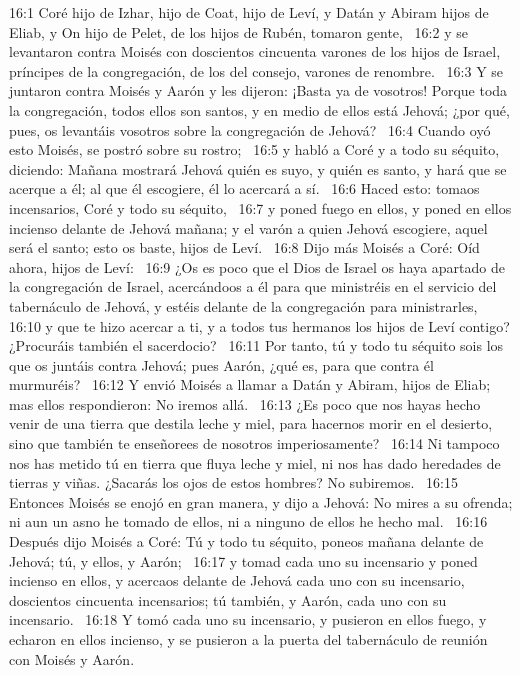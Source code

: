 16:1 Coré hijo de Izhar, hijo de Coat, hijo de Leví, y Datán y Abiram hijos de Eliab, y On hijo de Pelet, de los hijos de Rubén, tomaron gente,  
16:2 y se levantaron contra Moisés con doscientos cincuenta varones de los hijos de Israel, príncipes de la congregación, de los del consejo, varones de renombre.  
16:3 Y se juntaron contra Moisés y Aarón y les dijeron: ¡Basta ya de vosotros! Porque toda la congregación, todos ellos son santos, y en medio de ellos está Jehová; ¿por qué, pues, os levantáis vosotros sobre la congregación de Jehová?  
16:4 Cuando oyó esto Moisés, se postró sobre su rostro;  
16:5 y habló a Coré y a todo su séquito, diciendo: Mañana mostrará Jehová quién es suyo, y quién es santo, y hará que se acerque a él; al que él escogiere, él lo acercará a sí.  
16:6 Haced esto: tomaos incensarios, Coré y todo su séquito,  
16:7 y poned fuego en ellos, y poned en ellos incienso delante de Jehová mañana; y el varón a quien Jehová escogiere, aquel será el santo; esto os baste, hijos de Leví.  
16:8 Dijo más Moisés a Coré: Oíd ahora, hijos de Leví:  
16:9 ¿Os es poco que el Dios de Israel os haya apartado de la congregación de Israel, acercándoos a él para que ministréis en el servicio del tabernáculo de Jehová, y estéis delante de la congregación para ministrarles,  
16:10 y que te hizo acercar a ti, y a todos tus hermanos los hijos de Leví contigo? ¿Procuráis también el sacerdocio?  
16:11 Por tanto, tú y todo tu séquito sois los que os juntáis contra Jehová; pues Aarón, ¿qué es, para que contra él murmuréis?  
16:12 Y envió Moisés a llamar a Datán y Abiram, hijos de Eliab; mas ellos respondieron: No iremos allá.  
16:13 ¿Es poco que nos hayas hecho venir de una tierra que destila leche y miel, para hacernos morir en el desierto, sino que también te enseñorees de nosotros imperiosamente?  
16:14 Ni tampoco nos has metido tú en tierra que fluya leche y miel, ni nos has dado heredades de tierras y viñas. ¿Sacarás los ojos de estos hombres? No subiremos.  
16:15 Entonces Moisés se enojó en gran manera, y dijo a Jehová: No mires a su ofrenda; ni aun un asno he tomado de ellos, ni a ninguno de ellos he hecho mal.  
16:16 Después dijo Moisés a Coré: Tú y todo tu séquito, poneos mañana delante de Jehová; tú, y ellos, y Aarón;  
16:17 y tomad cada uno su incensario y poned incienso en ellos, y acercaos delante de Jehová cada uno con su incensario, doscientos cincuenta incensarios; tú también, y Aarón, cada uno con su incensario.  
16:18 Y tomó cada uno su incensario, y pusieron en ellos fuego, y echaron en ellos incienso, y se pusieron a la puerta del tabernáculo de reunión con Moisés y Aarón.  
